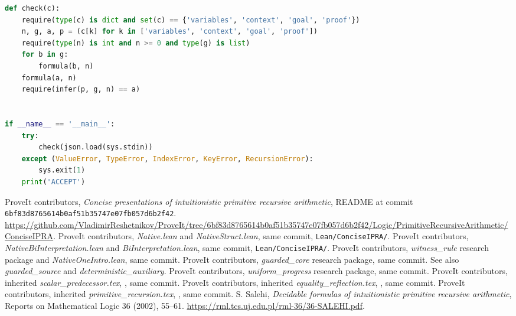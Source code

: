 \documentclass[11pt]{article}
\theoremstyle{definition}
\theoremstyle{remark}
\begin{document}
\begin{lstlisting}[language=Python]
def check(c):
    require(type(c) is dict and set(c) == {'variables', 'context', 'goal', 'proof'})
    n, g, a, p = (c[k] for k in ['variables', 'context', 'goal', 'proof'])
    require(type(n) is int and n >= 0 and type(g) is list)
    for b in g:
        formula(b, n)
    formula(a, n)
    require(infer(p, g, n) == a)


if __name__ == '__main__':
    try:
        check(json.load(sys.stdin))
    except (ValueError, TypeError, IndexError, KeyError, RecursionError):
        sys.exit(1)
    print('ACCEPT')
\end{lstlisting}

\begin{thebibliography}{10}
 ProveIt contributors, \emph{Concise presentations of
intuitionistic primitive recursive arithmetic}, README at commit
\texttt{6bf83d8765614b0af51b35747e07fb057d6b2f42}.
\url{https://github.com/VladimirReshetnikov/ProveIt/tree/6bf83d8765614b0af51b35747e07fb057d6b2f42/Logic/PrimitiveRecursiveArithmetic/ConciseIPRA}.
 ProveIt contributors, \emph{Native.lean} and
\emph{NativeStruct.lean}, same commit, \texttt{Lean/ConciseIPRA/}.
 ProveIt contributors, \emph{NativeBiInterpretation.lean}
and \emph{BiInterpretation.lean}, same commit, \texttt{Lean/ConciseIPRA/}.
 ProveIt contributors, \emph{witness\_rule} research
package and \emph{NativeOneIntro.lean}, same commit.
 ProveIt contributors, \emph{guarded\_core} research
package, same commit. See also \emph{guarded\_source} and
\emph{deterministic\_auxiliary}.
 ProveIt contributors, \emph{uniform\_progress} research
package, same commit.
 ProveIt contributors, inherited
\emph{scalar\_predecessor.tex},
, same commit.
 ProveIt contributors, inherited
\emph{equality\_reflection.tex},
, same commit.
 ProveIt contributors, inherited
\emph{primitive\_recursion.tex},
, same commit.
 S. Salehi, \emph{Decidable formulas of intuitionistic
primitive recursive arithmetic}, Reports on Mathematical Logic 36
(2002), 55--61.
\url{https://rml.tcs.uj.edu.pl/rml-36/36-SALEHI.pdf}.
\end{thebibliography}
\end{document}
